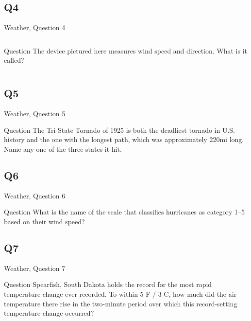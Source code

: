 \documentclass[11pt]{beamer}
\begin{document}
\subsection*{Q4}
\begin{frame}[t]{Weather, Question 4}
\begin{columns}[T,totalwidth=\linewidth]
\begin{column}{0.32\linewidth}
\begin{block}{Question}
The device pictured here measures wind speed and direction. What is it called?
\end{block}
\end{column}
\begin{column}{0.65\linewidth}
\begin{center}
\texttt{[image: \{Images/anemometer]}.jpg}
\end{center}
\end{column}
\end{columns}
\end{frame}
\subsection*{Q5}
\begin{frame}[t]{Weather, Question 5}
\begin{block}{Question}
The Tri-State Tornado of 1925 is both the deadliest tornado in U.S. history and the one with the longest path, which was approximately 220mi long. Name any one of the three states it hit.
\end{block}
\end{frame}
\subsection*{Q6}
\begin{frame}[t]{Weather, Question 6}
\begin{block}{Question}
What is the name of the scale that classifies hurricanes as category 1--5 based on their wind speed?
\end{block}
\end{frame}
\subsection*{Q7}
\begin{frame}[t]{Weather, Question 7}
\begin{block}{Question}
Spearfish, South Dakota holds the record for the most rapid temperature change ever recorded. To within 5 \textdegree{}F / 3 \textdegree{}C, how much did the air temperature there rise in the two-minute period over which this record-setting temperature change occurred?
\end{block}
\end{frame}
\end{document}
